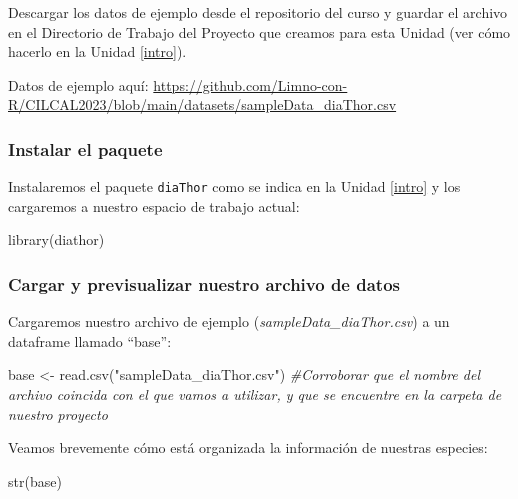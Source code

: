 \documentclass[
]{book}
\newenvironment{Shaded}{\begin{snugshade}}{\end{snugshade}}
\newcommand{\CommentTok}[1]{\textcolor[rgb]{0.56,0.35,0.01}{\textit{#1}}}
\newcommand{\FunctionTok}[1]{\textcolor[rgb]{0.00,0.00,0.00}{#1}}
\newcommand{\NormalTok}[1]{#1}
\newcommand{\OtherTok}[1]{\textcolor[rgb]{0.56,0.35,0.01}{#1}}
\newcommand{\StringTok}[1]{\textcolor[rgb]{0.31,0.60,0.02}{#1}}
\begin{document}
Descargar los datos de ejemplo desde el repositorio del curso y guardar el archivo en el Directorio de Trabajo del Proyecto que creamos para esta Unidad (ver cómo hacerlo en la Unidad \ref{intro}).

Datos de ejemplo aquí: \url{https://github.com/Limno-con-R/CILCAL2023/blob/main/datasets/sampleData_diaThor.csv}

\hypertarget{instalar-el-paquete}{%
\subsubsection{Instalar el paquete}\label{instalar-el-paquete}}

Instalaremos el paquete \texttt{diaThor}\citep{nicolosigelis2022} como se indica en la Unidad \ref{intro} y los cargaremos a nuestro espacio de trabajo actual:

\begin{Shaded}
\begin{Highlighting}[]
\FunctionTok{library}\NormalTok{(diathor)}
\end{Highlighting}
\end{Shaded}

\hypertarget{cargar-y-previsualizar-nuestro-archivo-de-datos}{%
\subsubsection{Cargar y previsualizar nuestro archivo de datos}\label{cargar-y-previsualizar-nuestro-archivo-de-datos}}

Cargaremos nuestro archivo de ejemplo (\emph{sampleData\_diaThor.csv}) a un dataframe llamado ``base'':

\begin{Shaded}
\begin{Highlighting}[]
\NormalTok{base }\OtherTok{\textless{}{-}} \FunctionTok{read.csv}\NormalTok{(}\StringTok{"sampleData\_diaThor.csv"}\NormalTok{) }\CommentTok{\#Corroborar que el nombre del archivo coincida con el que vamos a utilizar, y que se encuentre en la carpeta de nuestro proyecto}
\end{Highlighting}
\end{Shaded}

Veamos brevemente cómo está organizada la información de nuestras especies:

\begin{Shaded}
\begin{Highlighting}[]
\FunctionTok{str}\NormalTok{(base)}
\end{Highlighting}
\end{Shaded}
\end{document}
